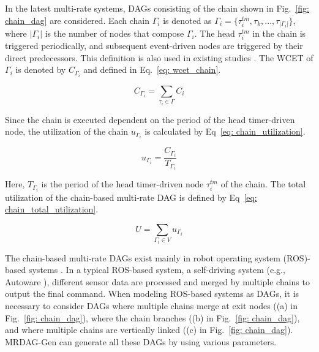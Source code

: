 In the latest multi-rate systems, DAGs consisting of the chain shown in Fig.~\ref{fig: chain_dag} are considered.
Each chain $\Gamma_i$ is denoted as $\Gamma_i = \{\tau^{tm}_i, \tau_k, ..., \tau_{|\Gamma_i|}\}$, where $|\Gamma_i|$ is the number of nodes that compose $\Gamma_i$.
The head $\tau^{tm}_i$ in the chain is triggered periodically, and subsequent event-driven nodes are triggered by their direct predecessors.
This definition is also used in existing studies \cite{choi2020chain, tang2020response}.
The WCET of $\Gamma_i$ is denoted by $C_{\Gamma_i}$ and defined in Eq.~\ref{eq: wcet_chain}.

\begin{equation}
    \label{eq: wcet_chain}
    C_{\Gamma_i} = \sum_{\tau_i \in \Gamma}C_i
\end{equation}

Since the chain is executed dependent on the period of the head timer-driven node, the utilization of the chain $u_{\Gamma_i}$ is calculated by Eq~\ref{eq: chain_utilization}.

\begin{equation}
    \label{eq: chain_utilization}
    u_{\Gamma_i} = \frac{C_{\Gamma_i}}{T_{\Gamma_i}}
\end{equation}

\noindent Here, $T_{\Gamma_i}$ is the period of the head timer-driven node $\tau^{tm}_i$ of the chain.
The total utilization of the chain-based multi-rate DAG is defined by Eq~\ref{eq: chain_total_utilization}.

\begin{equation}
    \label{eq: chain_total_utilization}
    U = \sum_{\Gamma_i \in V}u_{\Gamma_i}
\end{equation}

The chain-based multi-rate DAGs exist mainly in robot operating system (ROS)-based systems \cite{casini2019response, choi2021picas}.
In a typical ROS-based system, a self-driving system (e.g., Autoware \cite{future}), different sensor data are processed and merged by multiple chains to output the final command.
When modeling ROS-based systems as DAGs, it is necessary to consider DAGs where multiple chains merge at exit nodes ((a) in Fig.~\ref{fig: chain_dag}), where the chain branches ((b) in Fig.~\ref{fig: chain_dag}), and where multiple chains are vertically linked ((c) in Fig.~\ref{fig: chain_dag}).
MRDAG-Gen can generate all these DAGs by using various parameters.
